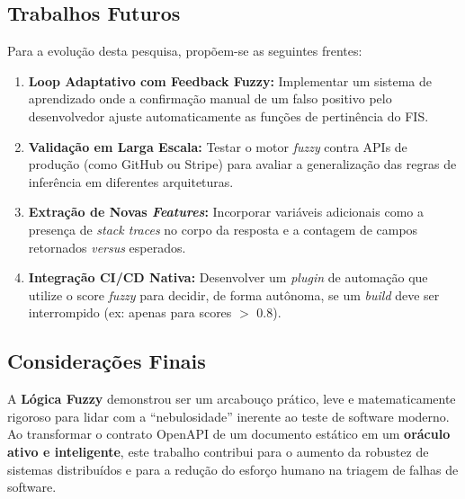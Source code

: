 \subsection{Trabalhos Futuros}

Para a evolução desta pesquisa, propõem-se as seguintes frentes:

\begin{enumerate}
    \item \textbf{Loop Adaptativo com Feedback Fuzzy:} Implementar um sistema de aprendizado onde a confirmação manual de um falso positivo pelo desenvolvedor ajuste automaticamente as funções de pertinência do FIS.
    \item \textbf{Validação em Larga Escala:} Testar o motor \textit{fuzzy} contra APIs de produção (como GitHub ou Stripe) para avaliar a generalização das regras de inferência em diferentes arquiteturas.
    \item \textbf{Extração de Novas \textit{Features}:} Incorporar variáveis adicionais como a presença de \textit{stack traces} no corpo da resposta e a contagem de campos retornados \textit{versus} esperados.
    \item \textbf{Integração CI/CD Nativa:} Desenvolver um \textit{plugin} de automação que utilize o score \textit{fuzzy} para decidir, de forma autônoma, se um \textit{build} deve ser interrompido (ex: apenas para scores $>$ 0.8).
\end{enumerate}

\subsection{Considerações Finais}

A \textbf{Lógica Fuzzy} demonstrou ser um arcabouço prático, leve e matematicamente rigoroso para lidar com a ``nebulosidade'' inerente ao teste de software moderno. Ao transformar o contrato OpenAPI de um documento estático em um \textbf{oráculo ativo e inteligente}, este trabalho contribui para o aumento da robustez de sistemas distribuídos e para a redução do esforço humano na triagem de falhas de software.